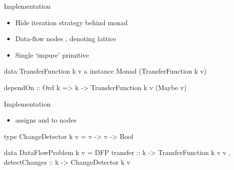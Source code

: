 \documentclass{haskellbeamer}
\begin{document}
\begin{frame}[fragile]{Implementation}
  \begin{itemize}
    \item Hide iteration strategy behind  monad
    \item Data-flow nodes , denoting lattice 
    \item Single `impure' primitive 
  \end{itemize}
  \begin{center}
    \begin{minipage}{0.9\textwidth}
      \begin{haskell}
        data TransferFunction k v a
        instance Monad (TransferFunction k v)

        dependOn
          :: Ord k
          => k
          -> TransferFunction k v (Maybe v)
      \end{haskell}
    \end{minipage}
  \end{center}
\end{frame}

\begin{frame}[fragile]{Implementation}
  \begin{itemize}
    \item {} assigns  and  to nodes
  \end{itemize}
  \begin{center}
    \begin{minipage}{0.9\textwidth}
      \begin{haskell}
        type ChangeDetector k v
          = v -> v -> Bool

        data DataFlowProblem k v 
          = DFP 
          { transfer      :: k -> TransferFunction k v v
          , detectChanges :: k -> ChangeDetector k v
          }
      \end{haskell}
    \end{minipage}
  \end{center}
\end{frame}
\end{document}
